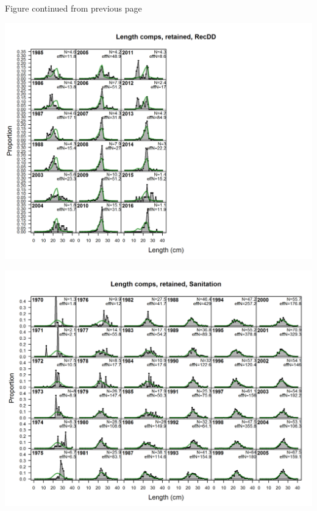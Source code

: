 \documentclass[ignorenonframetext,compress]{beamer}
\begin{document}
\begin{center} 

              Figure continued from previous page 

             \end{center}

\includegraphics{./r4ss/plots_mod1/comp_lenfit_flt6mkt2.png}

\includegraphics{./r4ss/plots_mod1/comp_lenfit_flt7mkt2_page1.png}
\end{document}

